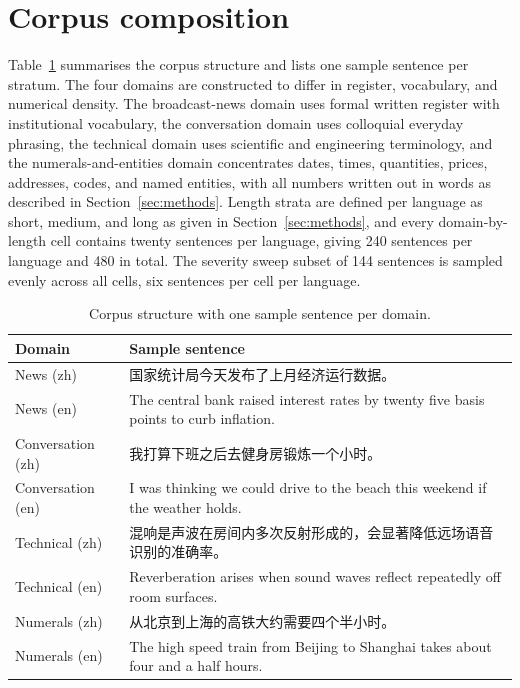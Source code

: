 \appendix
\section{Corpus composition}
\label{app:corpus}

Table~\ref{tab:corpus} summarises the corpus structure and lists one sample
sentence per stratum. The four domains are constructed to differ in register,
vocabulary, and numerical density. The broadcast-news domain uses formal
written register with institutional vocabulary, the conversation domain uses
colloquial everyday phrasing, the technical domain uses scientific and
engineering terminology, and the numerals-and-entities domain concentrates
dates, times, quantities, prices, addresses, codes, and named entities, with
all numbers written out in words as described in
Section~\ref{sec:methods}. Length strata are defined per language as short,
medium, and long as given in Section~\ref{sec:methods}, and every
domain-by-length cell contains twenty sentences per language, giving 240
sentences per language and 480 in total. The severity sweep subset of 144
sentences is sampled evenly across all cells, six sentences per cell per
language.

\begin{table}[h]
\centering
\caption{Corpus structure with one sample sentence per domain.}
\label{tab:corpus}
\small
\begin{tabular}{lp{9.3cm}}
\toprule
Domain & Sample sentence \\
\midrule
News (zh) & 国家统计局今天发布了上月经济运行数据。 \\
News (en) & The central bank raised interest rates by twenty five basis points to curb inflation. \\
Conversation (zh) & 我打算下班之后去健身房锻炼一个小时。 \\
Conversation (en) & I was thinking we could drive to the beach this weekend if the weather holds. \\
Technical (zh) & 混响是声波在房间内多次反射形成的，会显著降低远场语音识别的准确率。 \\
Technical (en) & Reverberation arises when sound waves reflect repeatedly off room surfaces. \\
Numerals (zh) & 从北京到上海的高铁大约需要四个半小时。 \\
Numerals (en) & The high speed train from Beijing to Shanghai takes about four and a half hours. \\
\bottomrule
\end{tabular}
\end{table}

